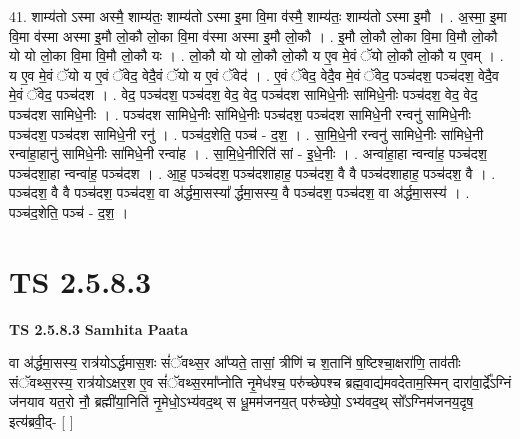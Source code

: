 \documentclass[17pt]{extarticle}
\begin{document}
41. शाम्य॑तो ऽस्मा अस्मै॒ शाम्य॑तः॒ शाम्य॑तो ऽस्मा इ॒मा वि॒मा व॑स्मै॒ शाम्य॑तः॒ शाम्य॑तो ऽस्मा इ॒मौ । . अ॒स्मा॒ इ॒मा वि॒मा व॑स्मा अस्मा इ॒मौ लो॒कौ लो॒का वि॒मा व॑स्मा अस्मा इ॒मौ लो॒कौ । . इ॒मौ लो॒कौ लो॒का वि॒मा वि॒मौ लो॒कौ यो यो लो॒का वि॒मा वि॒मौ लो॒कौ यः । . लो॒कौ यो यो लो॒कौ लो॒कौ य ए॒व मे॒वं ॅयो लो॒कौ लो॒कौ य ए॒वम् । . य ए॒व मे॒वं ॅयो य ए॒वं ॅवेद॒ वेदै॒वं ॅयो य ए॒वं ॅवेद॑ । . ए॒वं ॅवेद॒ वेदै॒व मे॒वं ॅवेद॒ पञ्च॑दश॒ पञ्च॑दश॒ वेदै॒व मे॒वं ॅवेद॒ पञ्च॑दश । . वेद॒ पञ्च॑दश॒ पञ्च॑दश॒ वेद॒ वेद॒ पञ्च॑दश सामिधे॒नीः सा॑मिधे॒नीः पञ्च॑दश॒ वेद॒ वेद॒ पञ्च॑दश सामिधे॒नीः । . पञ्च॑दश सामिधे॒नीः सा॑मिधे॒नीः पञ्च॑दश॒ पञ्च॑दश सामिधे॒नी रन्वनु॑ सामिधे॒नीः पञ्च॑दश॒ पञ्च॑दश सामिधे॒नी रनु॑ । . पञ्च॑द॒शेति॒ पञ्च॑ - द॒श॒ । . सा॒मि॒धे॒नी रन्वनु॑ सामिधे॒नीः सा॑मिधे॒नी रन्वा॑हा॒हानु॑ सामिधे॒नीः सा॑मिधे॒नी रन्वा॑ह । . सा॒मि॒धे॒नीरिति॑ सां - इ॒धे॒नीः । . अन्वा॑हा॒हा न्वन्वा॑ह॒ पञ्च॑दश॒ पञ्च॑दशा॒हा न्वन्वा॑ह॒ पञ्च॑दश । . आ॒ह॒ पञ्च॑दश॒ पञ्च॑दशाहाह॒ पञ्च॑दश॒ वै वै पञ्च॑दशाहाह॒ पञ्च॑दश॒ वै । . पञ्च॑दश॒ वै वै पञ्च॑दश॒ पञ्च॑दश॒ वा अ॑र्द्धमा॒सस्या᳚ र्द्धमा॒सस्य॒ वै पञ्च॑दश॒ पञ्च॑दश॒ वा अ॑र्द्धमा॒सस्य॑ । . पञ्च॑द॒शेति॒ पञ्च॑ - द॒श॒ । \newline
\pagebreak
{}
\section*{ TS 2.5.8.3 }

\textbf{TS 2.5.8.3 } \newline
\textbf{Samhita Paata} \newline

वा अ॑र्द्धमा॒सस्य॒ रात्र॑योऽर्द्धमास॒शः सं॑ॅवथ्स॒र आ᳚प्यते॒ तासां॒ त्रीणि॑ च श॒तानि॑ ष॒ष्टिश्चा॒क्षरा॑णि॒ ताव॑तीः संॅवथ्स॒रस्य॒ रात्र॑योऽक्षर॒श ए॒व सं॑ॅवथ्स॒रमा᳚प्नोति नृ॒मेध॑श्च॒ परु॑च्छेपश्च ब्रह्म॒वाद्य॑मवदेताम॒स्मिन् दारा॑वा॒र्द्रे᳚ऽग्निं ज॑नयाव यत॒रो नौ॒ ब्रह्मी॑या॒निति॑ नृ॒मेधो॒ऽभ्य॑वद॒थ् स धू॒मम॑जनय॒त् परु॑च्छेपो॒ ऽभ्य॑वद॒थ् सो᳚ऽग्निम॑जनय॒दृष॒ इत्य॑ब्रवी॒द्-  [  ] \newline
\end{document}
